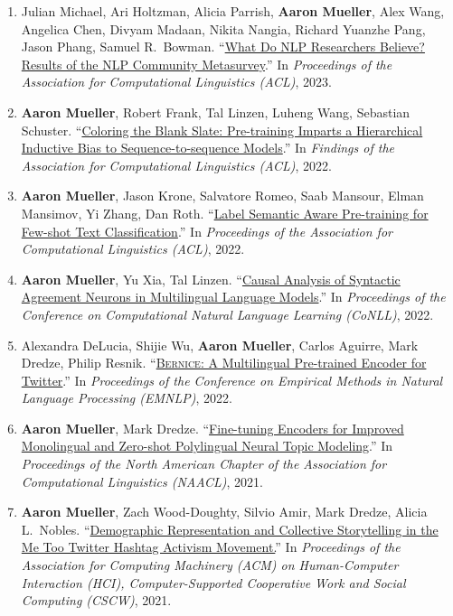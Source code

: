 \documentclass[10pt]{article}
\providecommand*\titlelink[2]{\href{#1}{\textcolor{accent}{#2}}}
\begin{document}
\begin{enumerate}[leftmargin=*, topsep=0pt, itemsep=0.25ex, partopsep=0ex, parsep=1ex, label=C\arabic*., ref=C\arabic*]
	\item Julian Michael, Ari Holtzman, Alicia Parrish, \textbf{Aaron Mueller}, Alex Wang, Angelica Chen, Divyam Madaan, Nikita Nangia, Richard Yuanzhe Pang, Jason Phang, Samuel R.\ Bowman. ``\titlelink{https://arxiv.org/abs/2208.12852}{What Do NLP Researchers Believe? Results of the NLP Community Metasurvey}.'' In \emph{Proceedings of the Association for Computational Linguistics (ACL)}, 2023.
	
	\item \textbf{Aaron Mueller}, Robert Frank, Tal Linzen, Luheng Wang, Sebastian Schuster. ``\titlelink{https://aclanthology.org/2022.findings-acl.106.pdf}{Coloring the Blank Slate: Pre-training Imparts a Hierarchical Inductive Bias to Sequence-to-sequence Models}.'' In \emph{Findings of the Association for Computational Linguistics (ACL)}, 2022.

	\item \textbf{Aaron Mueller}, Jason Krone, Salvatore Romeo, Saab Mansour, Elman Mansimov, Yi Zhang, Dan Roth. ``\titlelink{https://aclanthology.org/2022.acl-long.570/}{Label Semantic Aware Pre-training for Few-shot Text Classification}.'' In \emph{Proceedings of the Association for Computational Linguistics (ACL)}, 2022.\label{pub:lsap}
	
	\item \textbf{Aaron Mueller}, Yu Xia, Tal Linzen. ``\titlelink{https://arxiv.org/abs/2210.14328}{Causal Analysis of Syntactic Agreement Neurons in Multilingual Language Models}.'' In \emph{Proceedings of the Conference on Computational Natural Language Learning (CoNLL)}, 2022.\label{pub:causal-multiling}
	
	\item Alexandra DeLucia, Shijie Wu, \textbf{Aaron Mueller}, Carlos Aguirre, Mark Dredze, Philip Resnik. ``\titlelink{https://preview.aclanthology.org/emnlp-22-ingestion/2022.emnlp-main.415/}{\textsc{Bernice}: A Multilingual Pre-trained Encoder for Twitter}.'' In \emph{Proceedings of the Conference on Empirical Methods in Natural Language Processing (EMNLP)}, 2022.
			
	\item \textbf{Aaron Mueller}, Mark Dredze. ``\titlelink{https://aclanthology.org/2021.naacl-main.243/}{Fine-tuning Encoders for Improved Monolingual and Zero-shot Polylingual Neural Topic Modeling}.'' In \emph{Proceedings of the North American Chapter of the Association for Computational Linguistics (NAACL)}, 2021.  
	
	\item \textbf{Aaron Mueller}, Zach Wood-Doughty, Silvio Amir, Mark Dredze, Alicia L.\ Nobles. ``\titlelink{https://dl.acm.org/doi/10.1145/3449181}{Demographic Representation and Collective Storytelling in the Me Too Twitter Hashtag Activism Movement.}'' In \emph{Proceedings of the Association for Computing Machinery (ACM) on Human-Computer Interaction (HCI), Computer-Supported Cooperative Work and Social Computing (CSCW)}, 2021.


\end{enumerate}
\end{document}
